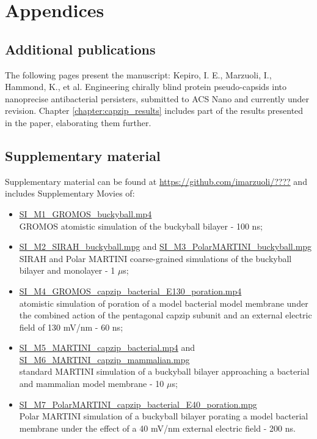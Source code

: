 
\setcounter{chapter}{-1}
\chapter{Appendices} \label{appendix}
\renewcommand{\thechapter}{A}


\section{Additional publications}
The following pages present the manuscript:
Kepiro, I. E., Marzuoli, I., Hammond, K., et al. Engineering chirally blind protein pseudo-capsids into nanoprecise antibacterial persisters, submitted to ACS Nano and currently under revision. Chapter \ref{chapter:capzip_results} includes part of the results presented in the paper, elaborating them further.





\section{Supplementary material}
\label{sec:SI}
Supplementary material can be found at \url{https://github.com/imarzuoli/????} and includes Supplementary Movies of:
\begin{itemize}
\item \url{SI_M1_GROMOS_buckyball.mp4} \\ GROMOS atomistic simulation of the buckyball bilayer - 100 ns;

\item \url{SI_M2_SIRAH_buckyball.mpg} and \url{SI_M3_PolarMARTINI_buckyball.mpg} \\ SIRAH and Polar MARTINI coarse-grained simulations of the buckyball bilayer and monolayer - 1 $\mu$s;

\item \url{SI_M4_GROMOS_capzip_bacterial_E130_poration.mp4} \\ atomistic simulation of poration of a model bacterial model membrane under the combined action of the pentagonal capzip subunit and an external electric field of 130 mV/nm - 60 ns;

\item \url{SI_M5_MARTINI_capzip_bacterial.mp4} and \url{SI_M6_MARTINI_capzip_mammalian.mpg} \\ standard MARTINI simulation of a buckyball bilayer approaching a bacterial and mammalian model membrane - 10 $\mu$s;

\item \url{SI_M7_PolarMARTINI_capzip_bacterial_E40_poration.mpg} \\ Polar MARTINI simulation of a buckyball bilayer porating a model bacterial membrane under the effect of a 40 mV/nm external electric field - 200 ns.
\end{itemize}


